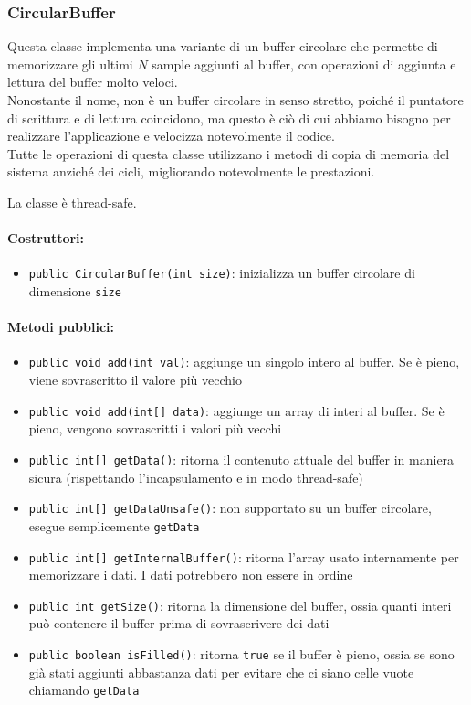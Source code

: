 \subsubsection{CircularBuffer}
Questa classe implementa una variante di un buffer circolare che permette di memorizzare gli ultimi $N$ sample aggiunti al buffer, con operazioni di aggiunta e lettura del buffer molto veloci.\\
Nonostante il nome, non è un buffer circolare in senso stretto, poiché il puntatore di scrittura e di lettura coincidono, ma questo è ciò di cui abbiamo bisogno per realizzare l'applicazione e velocizza notevolmente il codice.\\
Tutte le operazioni di questa classe utilizzano i metodi di copia di memoria del sistema anziché dei cicli, migliorando notevolmente le prestazioni.

La classe è thread-safe.

\paragraph{Costruttori:}\begin{itemize}
	\item \texttt{public CircularBuffer(int size)}: inizializza un buffer circolare di dimensione \texttt{size}
\end{itemize}

\paragraph{Metodi pubblici:}\begin{itemize}
	\item \texttt{public void add(int val)}: aggiunge un singolo intero al buffer. Se è pieno, viene sovrascritto il valore più vecchio
	\item \texttt{public void add(int[] data)}: aggiunge un array di interi al buffer. Se è pieno, vengono sovrascritti i valori più vecchi
	\item \texttt{public int[] getData()}: ritorna il contenuto attuale del buffer in maniera sicura (rispettando l'incapsulamento e in modo thread-safe)
	\item \texttt{public int[] getDataUnsafe()}: non supportato su un buffer circolare, esegue semplicemente \texttt{getData}
	\item \texttt{public int[] getInternalBuffer()}: ritorna l'array usato internamente per memorizzare i dati. I dati potrebbero non essere in ordine
	\item \texttt{public int getSize()}: ritorna la dimensione del buffer, ossia quanti interi può contenere il buffer prima di sovrascrivere dei dati
	\item \texttt{public boolean isFilled()}: ritorna \texttt{true} se il buffer è pieno, ossia se sono già stati aggiunti abbastanza dati per evitare che ci siano celle vuote chiamando \texttt{getData}
\end{itemize}


